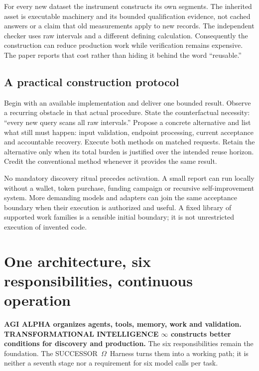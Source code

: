 \documentclass[11pt,letterpaper]{article}
\newcommand{\Om}{SUCCESSOR~$\Omega$}
\begin{document}
For every new dataset the instrument constructs its own segments. The inherited asset is executable machinery and its bounded qualification evidence, not cached answers or a claim that old measurements apply to new records. The independent checker uses raw intervals and a different defining calculation. Consequently the construction can reduce production work while verification remains expensive. The paper reports that cost rather than hiding it behind the word ``reusable.''

\subsection{A practical construction protocol}
Begin with an available implementation and deliver one bounded result. Observe a recurring obstacle in that actual procedure. State the counterfactual necessity: ``every new query scans all raw intervals.'' Propose a concrete alternative and list what still must happen: input validation, endpoint processing, current acceptance and accountable recovery. Execute both methods on matched requests. Retain the alternative only when its total burden is justified over the intended reuse horizon. Credit the conventional method whenever it provides the same result.

No mandatory discovery ritual precedes activation. A small report can run locally without a wallet, token purchase, funding campaign or recursive self-improvement system. More demanding models and adapters can join the same acceptance boundary when their execution is authorized and useful. A fixed library of supported work families is a sensible initial boundary; it is not unrestricted execution of invented code.

\section{One architecture, six responsibilities, continuous operation}
\textbf{AGI ALPHA organizes agents, tools, memory, work and validation. TRANSFORMATIONAL INTELLIGENCE $\infty$ constructs better conditions for discovery and production.} The six responsibilities remain the foundation. The \Om\ Harness turns them into a working path; it is neither a seventh stage nor a requirement for six model calls per task.
\end{document}
